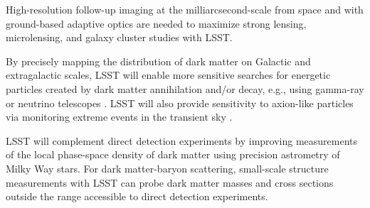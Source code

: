 \documentclass[12pt]{article}
\begin{document}
 High-resolution follow-up imaging at the milliarcsecond-scale from space and with ground-based adaptive optics are needed to maximize strong lensing, microlensing, and galaxy cluster studies with LSST.

 By precisely mapping the distribution of dark matter on Galactic and extragalactic scales, LSST will enable more sensitive searches for energetic particles created by dark matter annihilation and/or decay, e.g., using gamma-ray or neutrino telescopes \citep{Charles:2016,Albert:2017,1404.5503}.
LSST will also provide sensitivity to axion-like particles via monitoring extreme events in the transient sky \citep{2017PhRvL.118a1103M}.



 LSST will complement direct detection experiments by improving measurements of the local phase-space density of dark matter using precision astrometry of Milky Way stars.
For dark matter-baryon scattering, small-scale structure measurements with LSST can probe dark matter masses and cross sections outside the range accessible to direct detection experiments.

\end{document}
